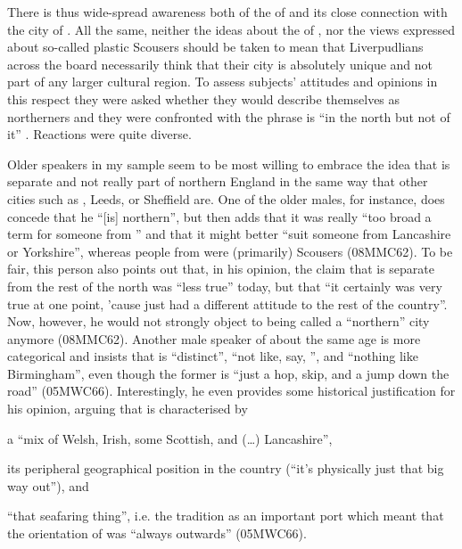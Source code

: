 There is thus wide-spread awareness both of the  of  and its close connection with the city of .
All the same, neither the ideas about the  of , nor the views expressed about so-called plastic Scousers should be taken to mean that Liverpudlians across the board necessarily think that their city is absolutely unique and not part of any larger cultural region.
To assess subjects' attitudes and opinions in this respect they were asked whether they would describe themselves as northerners and they were confronted with the phrase  is ``in the north but not of it'' \parencite[xxx]{belchem2006b}.
Reactions were quite diverse.

Older speakers in my sample seem to be most willing to embrace the idea that  is separate and not really part of northern England in the same way that other cities such as , Leeds, or Sheffield are.
One of the older males, for instance, does concede that he ``[is] northern'', but then adds that it was really ``too broad a term for someone from '' and that it might better ``suit someone from Lancashire or Yorkshire'', whereas people from  were (primarily) Scousers (08MMC62).
To be fair, this person also points out that, in his opinion, the claim that  is separate from the rest of the north was ``less true'' today, but that ``it certainly was very true at one point, 'cause  just had a different attitude to the rest of the country''.
Now, however, he would not strongly object to  being called a ``northern'' city anymore (08MMC62).
Another male speaker of about the same age is more categorical and insists that  is ``distinct'', ``not like, say, '', and ``nothing like Birmingham'', even though the former is ``just a hop, skip, and a jump down the road'' (05MWC66).
Interestingly, he even provides some historical justification for his opinion, arguing that  is characterised by
\begin{inparaenum}[(1)]
	\item a ``mix of Welsh, Irish, some Scottish, and (\ldots) Lancashire'',
	\item its peripheral geographical position in the country (``it's physically just that big way out''), and
	\item ``that seafaring thing'', i.e. the tradition as an important port which meant that the orientation of  was ``always outwards'' (05MWC66).
\end{inparaenum}

